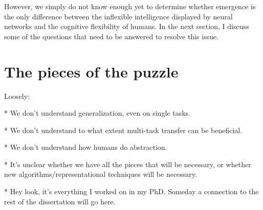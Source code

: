 However, we simply do not know enough yet to determine whether emergence is the only difference between the inflexible intelligence displayed by neural networks and the cognitive flexibility of humans. In the next section, I discuss some of the questions that need to be answered to resolve this issue. 

\section{The pieces of the puzzle}

Loosely:

* We don't understand generalization, even on single tasks.

* We don't understand to what extent multi-task transfer can be beneficial.

* We don't understand how humans do abstraction.

* It's unclear whether we have all the pieces that will be necessary, or whether new algorithms/representational techniques will be necessary.

* Hey look, it's everything I worked on in my PhD. Someday a connection to the rest of the dissertation will go here.


